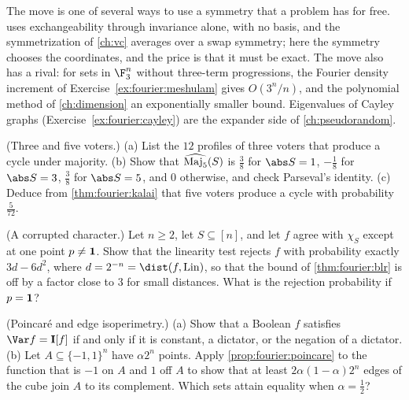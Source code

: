 \begin{refsection}

The move is one of several ways to use a symmetry that a problem has for free.  uses exchangeability through invariance alone, with no basis, and the symmetrization of \cref{ch:vc} averages over a swap symmetry; here the symmetry chooses the coordinates, and the price is that it must be exact. The move also has a rival: for sets in $\F_3^n$ without three-term progressions, the Fourier density increment of Exercise~\ref{ex:fourier:meshulam} gives $O(3^n/n)$, and the polynomial method of \cref{ch:dimension} an exponentially smaller bound. Eigenvalues of Cayley graphs (Exercise~\ref{ex:fourier:cayley}) are the expander side of \cref{ch:pseudorandom}.

\begin{exercises}
\item \consolidation (Three and five voters.) (a) List the $12$ profiles of three voters that produce a cycle under majority. (b) Show that $\widehat{\operatorname{Maj}_5}(S)$ is $\frac38$ for $\abs S=1$, $-\frac18$ for $\abs S=3$, $\frac38$ for $\abs S=5$, and $0$ otherwise, and check Parseval's identity. (c) Deduce from \cref{thm:fourier:kalai} that five voters produce a cycle with probability $\frac5{72}$.\label{ex:fourier:maj5}

\item \consolidation (A corrupted character.) Let $n\ge2$, let $S\subseteq[n]$, and let $f$ agree with $\chi_S$ except at one point $p\ne\mathbf{1}$. Show that the linearity test rejects $f$ with probability exactly $3d-6d^2$, where $d=2^{-n}=\dist(f,\fourierLin)$, so that the bound of \cref{thm:fourier:blr} is off by a factor close to $3$ for small distances. What is the rejection probability if $p=\mathbf{1}$?\label{ex:fourier:corrupt}

\item \consolidation (Poincaré and edge isoperimetry.) (a) Show that a Boolean $f$ satisfies $\Var f=\fourierTI[f]$ if and only if it is constant, a dictator, or the negation of a dictator. (b) Let $A\subseteq\{-1,1\}^n$ have $\alpha2^n$ points. Apply \cref{prop:fourier:poincare} to the function that is $-1$ on $A$ and $1$ off $A$ to show that at least $2\alpha(1-\alpha)2^n$ edges of the cube join $A$ to its complement. Which sets attain equality when $\alpha=\frac12$?\label{ex:fourier:poincare}


\end{exercises}
\end{refsection}
